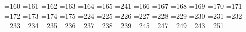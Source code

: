 =160 %
{}=161 %
{}=162 %
{}=163 %
{}=164 %
{}=165 %
{}=241 %
{}=166 %
{}=167 %
{}=168 %
{}=169 %
{}=170 %
{}=171 %
{}=172 %
{}=173 %
{}=174 %
{}=175 %
{}=224 %
{}=225 %
{}=226 %
{}=227 %
{}=228 %
{}=229 %
{}=230 %
{}=231 %
{}=232 %
{}=233 %
{}=234 %
{}=235 %
{}=236 %
{}=237 %
{}=238 %
{}=239 %
=245 %
{}=247 %
{}=249 %
{}=243 %
{}=251 %
